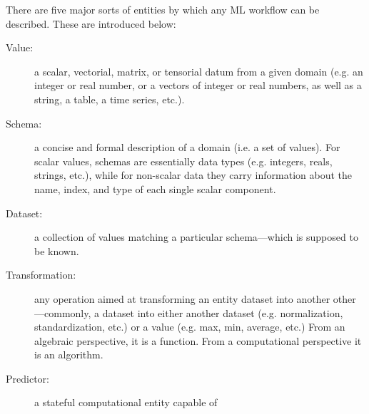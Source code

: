 \documentclass[12pt,a4paper,openright,twoside]{book}
\begin{document}
There are five major sorts of entities by which any ML workflow can be described.
%
These are introduced below:
%
\begin{description}
    \item[Value:] a scalar, vectorial, matrix, or tensorial datum from a given domain (e.g. an integer or real number, or a vectors of integer or real numbers, as well as a string, a table, a time series, etc.).

    \item[Schema:] a concise and formal description of a domain (i.e. a set of values).
    For scalar values, schemas are essentially data types (e.g. integers, reals, strings, etc.), while for non-scalar data they carry information about the name, index, and type of each single scalar component.

    \item[Dataset:] a collection of values matching a particular schema---which is supposed to be known.

    \item[Transformation:] any operation aimed at transforming an entity dataset into another other---commonly, a dataset into either another dataset (e.g. normalization, standardization, etc.) or a value (e.g. max, min, average, etc.)
    From an algebraic perspective, it is a function.
    From a computational perspective it is an algorithm.

    \item[Predictor:] a stateful computational entity capable of
\end{description}
\end{document}
